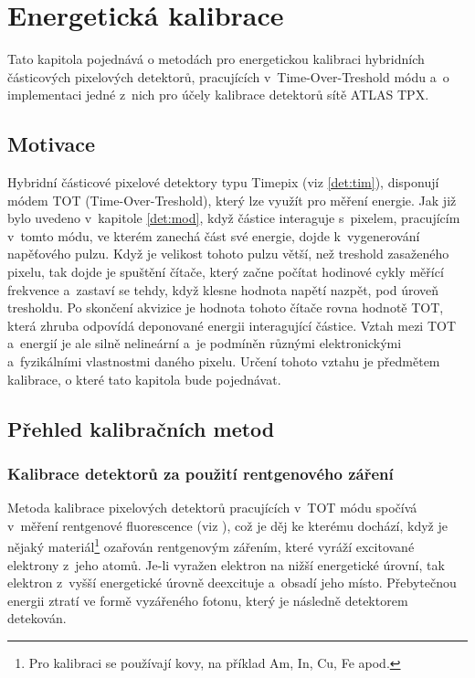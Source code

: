 

\chapter{Energetická kalibrace}\label{calib}
Tato kapitola pojednává o metodách pro energetickou kalibraci hybridních částicových pixelových detektorů, pracujících v~Time-Over-Treshold módu a~o implementaci jedné z~nich pro účely kalibrace detektorů sítě ATLAS TPX.

\section{Motivace}
Hybridní částicové pixelové detektory typu Timepix (viz \ref{det:tim}), disponují módem TOT (Time-Over-Treshold), který lze využít pro měření energie. Jak již bylo uvedeno v~kapitole \ref{det:mod}, když částice interaguje s~pixelem, pracujícím v~tomto módu, ve kterém zanechá část své energie, dojde k~vygenerování napěťového pulzu. Když je velikost tohoto pulzu větší, než treshold zasaženého pixelu, tak dojde je spuštění čítače, který začne počítat hodinové cykly měřící frekvence a~zastaví se tehdy, když klesne hodnota napětí nazpět, pod úroveň tresholdu. Po skončení akvizice je hodnota tohoto čítače rovna hodnotě TOT, která zhruba odpovídá deponované energii interagující částice. Vztah mezi TOT a~energií je ale silně nelineární a~je podmíněn různými elektronickými a~fyzikálními vlastnostmi daného pixelu. Určení tohoto vztahu je předmětem kalibrace, o které tato kapitola bude pojednávat.

\section{Přehled kalibračních metod}

\subsection{Kalibrace detektorů za použití rentgenového záření}\label{calib:xray}
Metoda kalibrace pixelových detektorů pracujících v~TOT módu \cite{Jakubek2011S262} spočívá v~měření rentgenové fluorescence (viz \cite{Jakubek-radiography_and_charge_sharing}),
což je děj ke kterému dochází, když je nějaký materiál\footnote{Pro kalibraci se používají kovy, na příklad Am, In, Cu, Fe apod.}
ozařován rentgenovým zářením, které vyráží excitované elektrony z~jeho atomů. Je-li vyražen elektron na nižší energetické úrovní, tak elektron z~vyšší energetické úrovně deexcituje a~obsadí jeho místo. Přebytečnou energii ztratí ve formě vyzářeného fotonu, který je následně detektorem detekován. 

